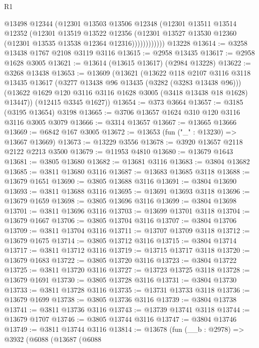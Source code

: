 \begin{lexlean}{R1}
\begin{coremodule}
                  @13498
                  @12344
                  (@12301
                    @13503
                    @13506
                    @12348
                    (@12301
                      @13511
                      @13514
                      @12352
                      (@12301
                        @13519
                        @13522
                        @12356
                        (@12301 @13527 @13530 @12360 (@12301 @13535 @13538 @12364 @12316))))))))))))
    @13228
@13614 := @3258 @13438 @1767 @2108 @3119 @3116
@13615 := @2958 @13435
@13617 := @2958 @1628 @3005
@13621 := @13614 (@13615 @13617) (@2984 @13228)
@13622 := @3268 @13438
@13653 := @13609
    (@13621
      (@13622
        @118
        @2107
        @3116
        @3118
        @13435
        @13617
        (@3277 @13438 @96 @13435 (@3282 (@3283 @13438 @96)))
        (@13622 @1629 @120 @3116 @3116 @1628 @3005 (@3418 @13438 @18 @1628) @13447))
      (@12415 @3345 @1627))
@13654 := @373 @3664
@13657 := @3185 (@3195 @13654) @3198
@13665 := @3706 @13657 @1624 @310 @120 @3116 @3116 @3005 @3079
@13666 := @3314 @13657
@13667 := @13665 @13666
@13669 := @6842 @167 @3005
@13672 := @13653 (fun ("_" : @13230) => @13667 @13669)
@13673 := @13229 @3556
@13678 := @3920 @13657 @2118 @2122 @2213 @3500
@13679 := @11953 @4810
@13680 := @13679 @1643
@13681 := @3805 @13680
@13682 := @13681 @3116
@13683 := @3804 @13682
@13685 := @3811 @13680 @3116
@13687 := @13683 @13685 @3118
@13688 := @13679 @1651
@13690 := @3805 @13688 @3116
@13691 := @3804 @13690
@13693 := @3811 @13688 @3116
@13695 := @13691 @13693 @3118
@13696 := @13679 @1659
@13698 := @3805 @13696 @3116
@13699 := @3804 @13698
@13701 := @3811 @13696 @3116
@13703 := @13699 @13701 @3118
@13704 := @13679 @1667
@13706 := @3805 @13704 @3116
@13707 := @3804 @13706
@13709 := @3811 @13704 @3116
@13711 := @13707 @13709 @3118
@13712 := @13679 @1675
@13714 := @3805 @13712 @3116
@13715 := @3804 @13714
@13717 := @3811 @13712 @3116
@13719 := @13715 @13717 @3118
@13720 := @13679 @1683
@13722 := @3805 @13720 @3116
@13723 := @3804 @13722
@13725 := @3811 @13720 @3116
@13727 := @13723 @13725 @3118
@13728 := @13679 @1691
@13730 := @3805 @13728 @3116
@13731 := @3804 @13730
@13733 := @3811 @13728 @3116
@13735 := @13731 @13733 @3118
@13736 := @13679 @1699
@13738 := @3805 @13736 @3116
@13739 := @3804 @13738
@13741 := @3811 @13736 @3116
@13743 := @13739 @13741 @3118
@13744 := @13679 @1707
@13746 := @3805 @13744 @3116
@13747 := @3804 @13746
@13749 := @3811 @13744 @3116
@13814 := @13678
    (fun (__b : @2978) =>
    @3932
      (@6088
        (@13687
          (@6088

\end{coremodule}
\end{lexlean}
